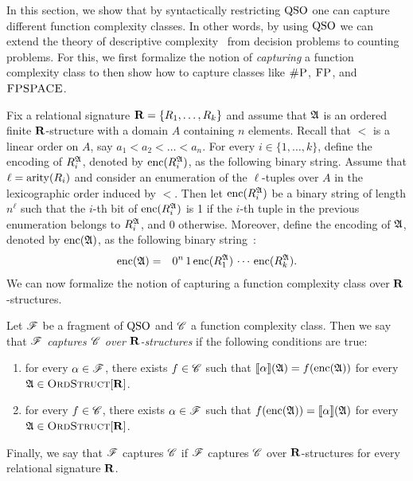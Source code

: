 
In this section, we show that by syntactically restricting ${\rm QSO}$ one can capture different function complexity classes. 
In other words, by using ${\rm QSO}$ we can extend the theory of descriptive complexity~\cite{immerman2012descriptive} from decision problems to counting problems. 
For this, we first formalize the notion of \emph{capturing} a function complexity class to then show how to capture classes like $\text{\sc \#P}$, $\text{\sc FP}$, and $\text{\sc FPSPACE}$.

Fix a relational signature $\mathbf{R} = \{R_1, \ldots, R_k\}$ and assume that $\mathfrak{A}$ is an ordered finite $\mathbf{R}$-structure with a domain $A$ containing $n$ elements. Recall that  $<$ is a linear order on $A$, say $a_1 < a_2 < \ldots < a_n$. For every $i \in \{1, \ldots, k\}$, define the encoding of $R_i^{\mathfrak{A}}$, denoted by ${\rm enc}(R_i^{\mathfrak{A}})$, as the following binary string. Assume that $\ell = {\rm arity}(R_i)$ and consider an enumeration of the $\ell$-tuples over $A$ in the lexicographic order induced by $<$. 
Then let ${\rm enc}(R_i^{\mathfrak{A}})$ be a binary string of length $n^\ell$ such that the $i$-th bit of ${\rm enc}(R_i^{\mathfrak{A}})$ is 1 if the $i$-th tuple in the previous enumeration belongs to $R_i^{\mathfrak{A}}$, and 0 otherwise. Moreover, define the encoding of $\mathfrak{A}$, denoted by ${\rm enc}(\mathfrak{A})$, as the following binary string~\cite{L04}:
\begin{eqnarray*}
	{\rm enc}(\mathfrak{A}) & = & 0^n \, 1 \, {\rm enc}(R_1^{\mathfrak{A}}) \, \cdots \, {\rm enc}(R_k^{\mathfrak{A}}).
\end{eqnarray*}
We can now formalize the notion of capturing a function complexity class over $\mathbf{R}$-structures.
\begin{definition} \label{cap-def}
	Let $\mathscr{F}$ be a fragment of ${\rm QSO}$ and $\mathscr{C}$ a function complexity class. Then we say that {\em  $\mathscr{F}$ captures $\mathscr{C}$ over $\mathbf{R}$-structures} if the  following conditions are true:
	\begin{enumerate}
		\item for every $\alpha \in \mathscr{F}$, there exists $f \in \mathscr{C}$ such that ${\llbracket{}{\alpha}\rrbracket}(\mathfrak{A}) = f({\rm enc}(\mathfrak{A}))$ for every $\mathfrak{A} \in \text{\sc OrdStruct}[\mathbf{R}]$. 
		
		\item for every $f \in \mathscr{C}$, there exists $\alpha \in \mathscr{F}$ such that   $f({\rm enc}(\mathfrak{A})) = {\llbracket{}{\alpha}\rrbracket}(\mathfrak{A})$ for every $\mathfrak{A} \in \text{\sc OrdStruct}[\mathbf{R}]$.
	\end{enumerate} 
	Finally, we say that $\mathscr{F}$ captures $\mathscr{C}$ if $\mathscr{F}$ captures $\mathscr{C}$ over $\mathbf{R}$-structures for every relational signature $\mathbf{R}$.
\end{definition}
